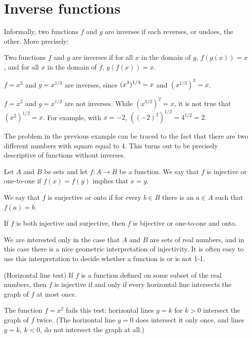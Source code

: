 \section{Inverse functions}{}{}

Informally, two functions $f$ and $g$ are {\dfont inverses\/} if
each reverses, or undoes, the other. More precisely:

 Two functions $f$ and $g$ are inverses if for all $x$ in the
domain of $g$,
$f(g(x))=x$, and for all $x$ in the domain of $f$, $g(f(x))=x$.
\enddef

\example $f=x^3$ and $g=x^{1/3}$ are inverses, since
$\displaystyle (x^3)^{1/3}=x$ and $(x^{1/3})^3=x$.
\endexample

\example $f=x^2$ and $g=x^{1/2}$ are not inverses. While
$(x^{1/2})^2=x$, it is not true that $(x^2)^{1/2}=x$. For example,
with $x=-2$, $((-2)^2)^{1/2}=4^{1/2}=2$.
\endexample

The problem in the previous example can be traced to the fact that
there are two different numbers with square equal to 4. This turns out
to be precisely descriptive of functions without inverses.

Let $A$ and  $B$  be sets and let $f:A\to B$ be a
function. We say that $f$ is {\dfont injective\/} or
{\dfont one-to-one\/} if $f(x)=f(y)$ implies that $x=y$.

We say that $f$ is {\dfont surjective\/} or {\dfont onto\/} if for
 every $b\in B$ there is an $a\in A$ such that $f(a)=b$. 

 If $f$ is both injective and surjective, then $f$ is
 {\dfont bijective\/} or {\dfont one-to-one and onto}. 

\enddef



We are interested only in the case that $A$ and $B$ are sets of real
numbers, and in this case there is a nice geometric interpretation of
injectivity. It is often easy to use this interpretation to decide
whether a function is or is not 1-1.

\thm (Horizontal line test) If $f$ is a function defined on some
subset of the real numbers, then $f$ is injective if and only if 
every horizontal line intersects the graph of $f$ at most once.
\endthmnoproof

\example The function $f=x^2$ fails this test: horizontal lines $y=k$
for $k>0$ intersect the graph of $f$ twice. (The horizontal line $y=0$
does intersect it only once, and lines $y=k$, $k<0$, do not intersect the
graph at all.)
\endexample


